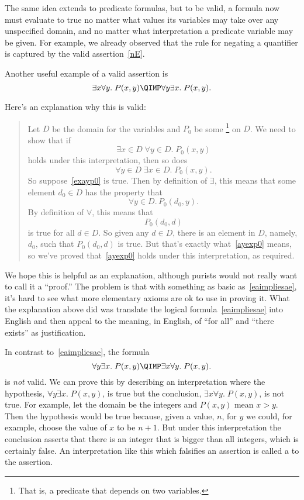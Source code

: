 The same idea extends to predicate formulas, but to be valid, a
formula now must evaluate to true no matter what values its variables
may take over any unspecified domain, and no matter what
interpretation a predicate variable may be given.  For example, we
already observed that the rule for negating a quantifier is captured
by the valid assertion~\eqref{nE}.

Another useful example of a valid assertion is
\begin{equation}\label{eaimpliesae}
\exists x \forall y.\; P(x,y) \QIMP \forall y \exists x.\; P(x,y).
\end{equation}

Here's an explanation why this is valid:

\begin{quote}
Let $D$ be the domain for the variables and $P_0$ be some
\footnote{That is, a predicate that depends on two variables.}
on $D$.  We need to show that if
\begin{equation}\label{exayp0}
\exists x \in D\; \forall y \in D.\; P_0(x,y)
\end{equation}
holds under this interpretation, then so does
\begin{equation}\label{ayexp0}
\forall y \in D\; \exists x \in D.\; P_0(x,y).
\end{equation}
So suppose~\eqref{exayp0} is true.  Then by definition of $\exists$, this
means that some element $d_0 \in D$ has the property that
\[
\forall y \in D.\, P_0(d_0, y).
\]
By definition of $\forall$, this means that
\[
P_0(d_0,d)
\]
is true for all $d \in D$.  So given any $d \in D$, there is an element in
$D$, namely, $d_0$, such that $P_0(d_0,d)$ is true.  But that's exactly
what~\eqref{ayexp0} means, so we've proved that~\eqref{ayexp0} holds under
this interpretation, as required.
\end{quote}

We hope this is helpful as an explanation, although purists would not
really want to call it a ``proof.''  The problem is that with something as basic
as~\eqref{eaimpliesae}, it's hard to see what more elementary axioms are
ok to use in proving it.  What the explanation above did was translate the
logical formula~\eqref{eaimpliesae} into English and then appeal to the
meaning, in English, of ``for all'' and ``there exists'' as justification.

In contrast to~\eqref{eaimpliesae}, the formula
\begin{equation}\label{aenotimplyea}
\forall y \exists x.\; P(x,y) \QIMP \exists x \forall y.\; P(x,y).
\end{equation}
is \emph{not} valid.  We can prove this by describing an
interpretation where the hypothesis, $\forall y \exists x.\; P(x,y)$, is
true but the conclusion, $\exists x \forall y.\; P(x,y)$, is not true.
For example, let the domain be the integers and $P(x,y)$ mean $x > y$.
Then the hypothesis would be true because, given a value, $n$, for $y$ we
could, for example, choose the value of $x$ to be $n+1$.  But under this
interpretation the conclusion asserts that there is an integer that is
bigger than all integers, which is certainly false.  An interpretation
like this which falsifies an assertion is called a  to
the assertion.


